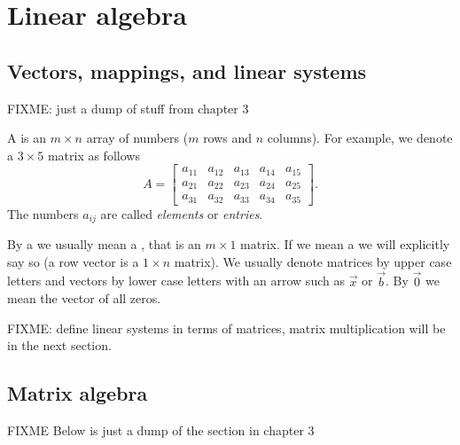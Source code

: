 \chapter{Linear algebra} \label{linalg:appendix}


\section{Vectors, mappings, and linear systems}
\label{vecsandmaps:section}


FIXME: just a dump of stuff from chapter 3

A \emph{}
is an $m
\times n$ array of numbers ($m$ rows and $n$ columns).  For example, we denote
a $3 \times 5$ matrix as follows
\begin{equation*}
A = 
\begin{bmatrix}
a_{11} & a_{12} & a_{13} & a_{14} & a_{15} \\
a_{21} & a_{22} & a_{23} & a_{24} & a_{25} \\
a_{31} & a_{32} & a_{33} & a_{34} & a_{35}
\end{bmatrix} .
\end{equation*}
The numbers $a_{ij}$ are called \emph{elements}
or \emph{entries}.

By a \emph{} we usually mean a \emph{}, that is an $m \times 1$ matrix.  If we mean a \emph{} we will explicitly say so (a row vector is a $1 \times n$ matrix).
We usually denote
matrices by upper case letters and vectors by lower case letters with an
arrow such as $\vec{x}$ or $\vec{b}$.  By $\vec{0}$ we mean the vector
of all zeros.

FIXME: define linear systems in terms of matrices, matrix multiplication
will be in the next section.


\sectionnewpage
\section{Matrix algebra}
\label{matalg:section}


FIXME  Below is just a dump of the section in chapter 3


